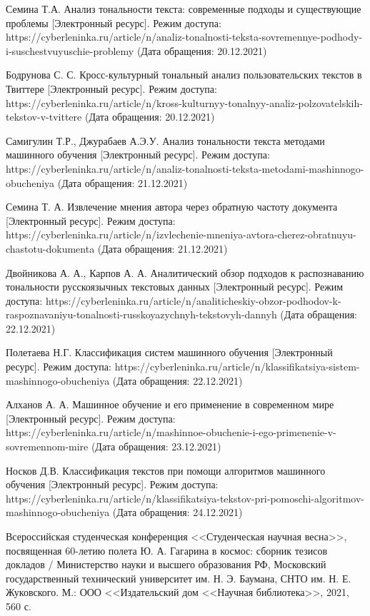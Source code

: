 \documentclass[a4paper,14pt, unknownkeysallowed]{extreport}
\begin{document}
\begin{thebibliography}{100}
	 Семина Т.А. Анализ тональности текста: современные подходы и существующие проблемы [Электронный ресурс]. Режим доступа: https://cyberleninka.ru/article/n/analiz-tonalnosti-teksta-sovremennye-podhody-i-suschestvuyuschie-problemy (Дата обращения: 20.12.2021)
	
	 Бодрунова С. С. Кросс-культурный тональный анализ пользовательских текстов в Твиттере [Электронный ресурс]. Режим доступа: https://cyberleninka.ru/article/n/kross-kulturnyy-tonalnyy-analiz-polzovatelskih-tekstov-v-tvittere (Дата обращения: 20.12.2021)
	
	 Самигулин Т.Р., Джурабаев А.Э.У. Анализ тональности текста методами машинного обучения [Электронный ресурс]. Режим доступа: https://cyberleninka.ru/article/n/analiz-tonalnosti-teksta-metodami-mashinnogo-obucheniya (Дата обращения: 21.12.2021)
	
	 Семина Т. А. Извлечение мнения автора через обратную частоту документа [Электронный ресурс]. Режим доступа: https://cyberleninka.ru/article/n/izvlechenie-mneniya-avtora-cherez-obratnuyu-chastotu-dokumenta (Дата обращения: 21.12.2021)
	
	 Двойникова А. А., Карпов А. А. Аналитический обзор подходов к распознаванию тональности русскоязычных текстовых данных [Электронный ресурс]. Режим доступа: https://cyberleninka.ru/article/n/analiticheskiy-obzor-podhodov-k-raspoznavaniyu-tonalnosti-russkoyazychnyh-tekstovyh-dannyh (Дата обращения: 22.12.2021)
	
	 Полетаева Н.Г. Классификация систем машинного обучения [Электронный ресурс]. Режим доступа: https://cyberleninka.ru/article/n/klassifikatsiya-sistem-mashinnogo-obucheniya (Дата обращения: 22.12.2021)
	
	 Алханов А. А. Машинное обучение и его применение в современном мире [Электронный ресурс]. Режим доступа: https://cyberleninka.ru/article/n/mashinnoe-obuchenie-i-ego-primenenie-v-sovremennom-mire (Дата обращения: 23.12.2021)
	
	 Носков Д.В. Классификация текстов при помощи алгоритмов машинного обучения [Электронный ресурс]. Режим доступа: https://cyberleninka.ru/article/n/klassifikatsiya-tekstov-pri-pomoschi-algoritmov-mashinnogo-obucheniya (Дата обращения: 24.12.2021)
	
	 Всероссийская студенческая конференция <<Студенческая научная весна>>, посвященная 60-летию полета Ю. А. Гагарина в космос: сборник тезисов докладов / Министерство науки и высшего образования РФ, Московский государственный технический университет им. Н. Э. Баумана, СНТО им. Н. Е. Жуковского. М.: ООО <<Издательский дом <<Научная библиотека>>, 2021, 560 с.
	

\end{thebibliography}
\end{document}
